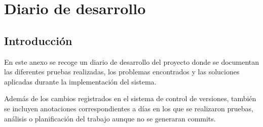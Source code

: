 \chapter{Diario de desarrollo}

\section{Introducción}

En este anexo se recoge un diario de desarrollo del proyecto donde se documentan
las diferentes pruebas realizadas, los problemas encontrados y las soluciones
aplicadas durante la implementación del sistema.

Además de los cambios registrados en el sistema de control de versiones,
también se incluyen anotaciones correspondientes a días en los que se realizaron
pruebas, análisis o planificación del trabajo aunque no se generaran commits.


